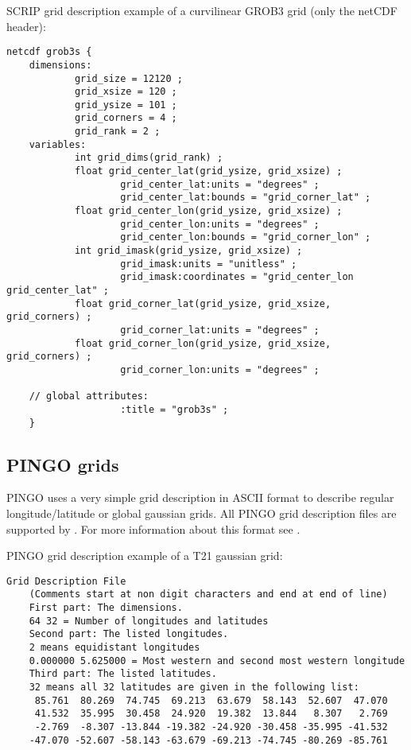 SCRIP grid description example of a curvilinear  GROB3 grid (only the netCDF header):
\begin{lstlisting}[frame=single, backgroundcolor=\color{zebg}, basicstyle=\footnotesize]
    netcdf grob3s {
    dimensions:
            grid_size = 12120 ;
            grid_xsize = 120 ;
            grid_ysize = 101 ;
            grid_corners = 4 ;
            grid_rank = 2 ;
    variables:
            int grid_dims(grid_rank) ;
            float grid_center_lat(grid_ysize, grid_xsize) ;
                    grid_center_lat:units = "degrees" ;
                    grid_center_lat:bounds = "grid_corner_lat" ;
            float grid_center_lon(grid_ysize, grid_xsize) ;
                    grid_center_lon:units = "degrees" ;
                    grid_center_lon:bounds = "grid_corner_lon" ;
            int grid_imask(grid_ysize, grid_xsize) ;
                    grid_imask:units = "unitless" ;
                    grid_imask:coordinates = "grid_center_lon grid_center_lat" ;
            float grid_corner_lat(grid_ysize, grid_xsize, grid_corners) ;
                    grid_corner_lat:units = "degrees" ;
            float grid_corner_lon(grid_ysize, grid_xsize, grid_corners) ;
                    grid_corner_lon:units = "degrees" ;

    // global attributes:
                    :title = "grob3s" ;
    }
\end{lstlisting}

\subsection{PINGO grids}

PINGO uses a very simple grid description in ASCII format
to describe regular longitude/latitude or global gaussian grids.
All PINGO grid description files are supported by {\CDO}. 
For more information about this format see \cite{PINGO}.

\vspace{2mm}

PINGO grid description example of a T21 gaussian grid:
\begin{lstlisting}[frame=single, backgroundcolor=\color{zebg}, basicstyle=\footnotesize]
    Grid Description File
    (Comments start at non digit characters and end at end of line)
    First part: The dimensions.
    64 32 = Number of longitudes and latitudes
    Second part: The listed longitudes.
    2 means equidistant longitudes
    0.000000 5.625000 = Most western and second most western longitude
    Third part: The listed latitudes.
    32 means all 32 latitudes are given in the following list:
     85.761  80.269  74.745  69.213  63.679  58.143  52.607  47.070
     41.532  35.995  30.458  24.920  19.382  13.844   8.307   2.769
     -2.769  -8.307 -13.844 -19.382 -24.920 -30.458 -35.995 -41.532
    -47.070 -52.607 -58.143 -63.679 -69.213 -74.745 -80.269 -85.761
\end{lstlisting}

